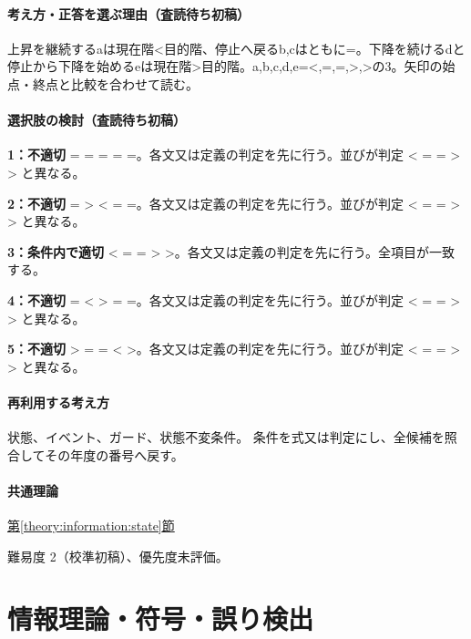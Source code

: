 \paragraph{考え方・正答を選ぶ理由（査読待ち初稿）} 上昇を継続するaは現在階<目的階、停止へ戻るb,cはともに=。下降を続けるdと停止から下降を始めるeは現在階>目的階。a,b,c,d,e=<,=,=,>,>の3。矢印の始点・終点と比較を合わせて読む。

\paragraph{選択肢の検討（査読待ち初稿）}\mbox{}\par

\noindent\textbf{1：不適切} = = = = =。各文又は定義の判定を先に行う。並びが判定 < = = > > と異なる。\par

\noindent\textbf{2：不適切} = > < = =。各文又は定義の判定を先に行う。並びが判定 < = = > > と異なる。\par

\noindent\textbf{3：条件内で適切} < = = > >。各文又は定義の判定を先に行う。全項目が一致する。\par

\noindent\textbf{4：不適切} = < > = =。各文又は定義の判定を先に行う。並びが判定 < = = > > と異なる。\par

\noindent\textbf{5：不適切} > = = < >。各文又は定義の判定を先に行う。並びが判定 < = = > > と異なる。\par

\paragraph{再利用する考え方} 状態、イベント、ガード、状態不変条件。 条件を式又は判定にし、全候補を照合してその年度の番号へ戻す。

\paragraph{共通理論} \hyperref[theory:information:state]{第\ref*{theory:information:state}節}

\par 難易度 2（校準初稿）、優先度未評価。

\section{情報理論・符号・誤り検出}

